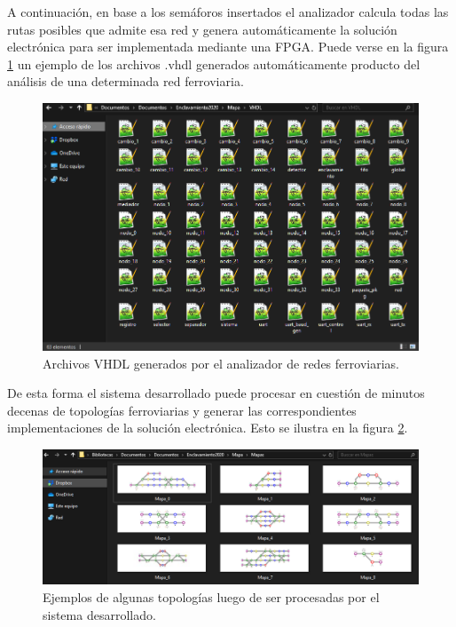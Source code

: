 		A continuación, en base a los semáforos insertados el analizador calcula todas las rutas posibles que admite esa red y genera automáticamente la solución electrónica para ser implementada mediante una FPGA. Puede verse en la figura \ref{fig:Archivos} un ejemplo de los archivos .vhdl generados automáticamente producto del análisis de una determinada red ferroviaria.		
		
		\begin{figure}[htbp!]
			\centering
			\includegraphics[scale=.5]{./Figures/Archivos}
			\caption{Archivos VHDL generados por el analizador de redes ferroviarias.}
			\label{fig:Archivos}
		\end{figure}
		
		De esta forma el sistema desarrollado puede procesar en cuestión de minutos decenas de topologías ferroviarias y generar las correspondientes implementaciones de la solución electrónica. Esto se ilustra en la figura \ref{fig:Topologias}. 
		
		\begin{figure}[htbp!]
			\centering
			\includegraphics[scale=.5]{./Figures/Topologias}
			\caption{Ejemplos de algunas topologías luego de ser procesadas por el sistema desarrollado.}
			\label{fig:Topologias}
		\end{figure}
		
